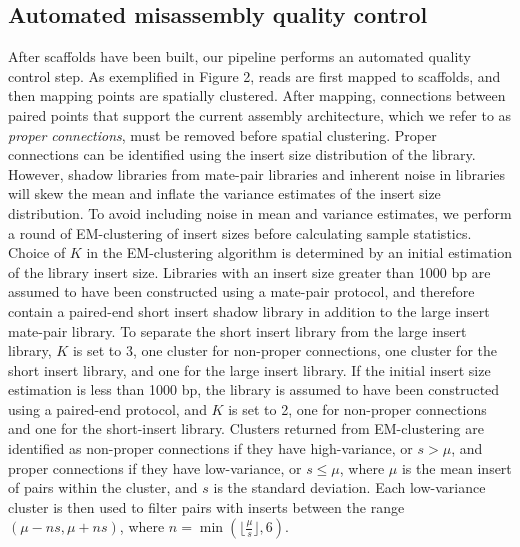 \documentclass{bioinfo}
\begin{document}
\subsection{Automated misassembly quality control}

After scaffolds have been built, our pipeline performs an automated quality control step.
As exemplified in Figure 2, reads are first mapped to scaffolds, and then mapping points are spatially clustered.
After mapping, connections between paired points that support the current assembly architecture, which we 
refer to as \emph{proper connections}, must be removed before spatial clustering. Proper connections
can be identified using the insert size distribution of the library. However, shadow libraries from 
mate-pair libraries and inherent noise in libraries will skew the mean and inflate the variance 
estimates of the insert size distribution. To avoid including noise in mean and variance estimates, 
we perform a round of EM-clustering of insert sizes before calculating sample statistics. Choice of $K$ in
the EM-clustering algorithm is determined by an initial estimation of the library insert size. Libraries with an 
insert size greater than 1000 bp are assumed to have been constructed using a mate-pair protocol, and therefore
contain a paired-end short insert shadow library in addition to the large insert mate-pair library. To separate the short insert library
from the large insert library, $K$ is set to 3, one cluster for non-proper connections, one cluster for the short insert
library, and one for the large insert library. If the initial insert size estimation is less than 1000 bp, the library
is assumed to have been constructed using a paired-end protocol, and $K$ is set to 2, one for non-proper connections
and one for the short-insert library. Clusters returned from EM-clustering are identified as non-proper connections if 
they have high-variance, or $s > \mu$, and proper connections if they have low-variance, or $s \le \mu$, where $\mu$ is the mean insert of pairs within
the cluster, and $s$ is the standard deviation. Each low-variance cluster is then used to filter 
pairs with inserts between the range $(\mu-ns,\mu+ns)$, where $n = \min(\lfloor\frac{\mu}{s}\rfloor, 6)$.  
\end{document}
